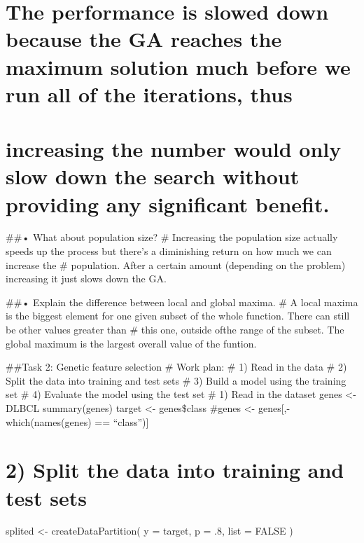 \documentclass[]{article}
\begin{document}
\hypertarget{the-performance-is-slowed-down-because-the-ga-reaches-the-maximum-solution-much-before-we-run-all-of-the-iterations-thus}{%
\section{The performance is slowed down because the GA reaches the
maximum solution much before we run all of the iterations,
thus}\label{the-performance-is-slowed-down-because-the-ga-reaches-the-maximum-solution-much-before-we-run-all-of-the-iterations-thus}}

\hypertarget{increasing-the-number-would-only-slow-down-the-search-without-providing-any-significant-benefit.}{%
\section{increasing the number would only slow down the search without
providing any significant
benefit.}\label{increasing-the-number-would-only-slow-down-the-search-without-providing-any-significant-benefit.}}

\#\#• What about population size? \# Increasing the population size
actually speeds up the process but there's a diminishing return on how
much we can increase the \# population. After a certain amount
(depending on the problem) increasing it just slows down the GA.

\#\#• Explain the difference between local and global maxima. \# A local
maxima is the biggest element for one given subset of the whole
function. There can still be other values greater than \# this one,
outside ofthe range of the subset. The global maximum is the largest
overall value of the funtion.

\#\#Task 2: Genetic feature selection \# Work plan: \# 1) Read in the
data \# 2) Split the data into training and test sets \# 3) Build a
model using the training set \# 4) Evaluate the model using the test set
\# 1) Read in the dataset genes \textless{}- DLBCL summary(genes) target
\textless{}- genes\$class \#genes \textless{}-
genes{[},-which(names(genes) == ``class''){]}

\hypertarget{split-the-data-into-training-and-test-sets}{%
\section{2) Split the data into training and test
sets}\label{split-the-data-into-training-and-test-sets}}

splited \textless{}- createDataPartition( y = target, p = .8, list =
FALSE )
\end{document}
